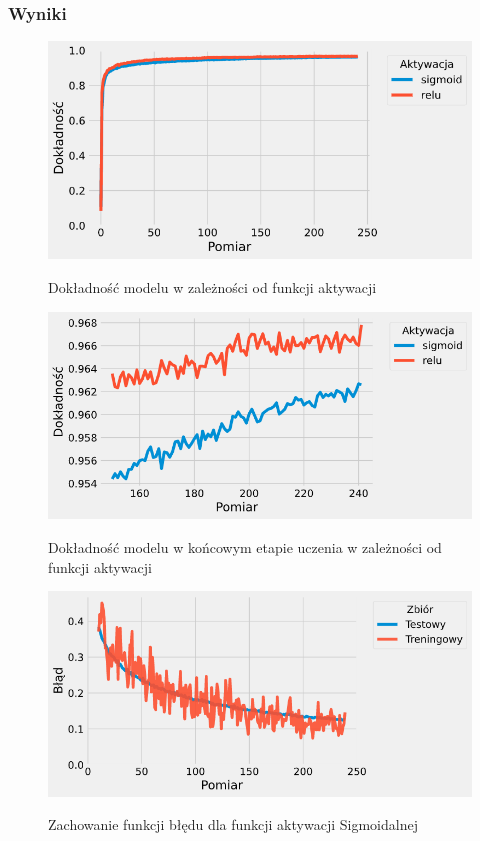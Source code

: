 \documentclass{article}
\begin{document}
\subsubsection*{Wyniki}
\begin{figure}[H]
	\centering
	\caption{Dokładność modelu w zależności od funkcji aktywacji}
	\includegraphics[width=\textwidth]{activation_acc.png}
	\label{fig:res51}
\end{figure}
\begin{figure}[H]
	\centering
	\caption{Dokładność modelu w końcowym etapie uczenia w zależności od funkcji aktywacji}
	\includegraphics[width=\textwidth]{activation_acc_zoom.png}
	\label{fig:res52}
\end{figure}
\begin{figure}[H]
	\centering
	\caption{Zachowanie funkcji błędu dla funkcji aktywacji Sigmoidalnej}
	\includegraphics[width=\textwidth]{activation_err_sig.png}
	\label{fig:res53}
\end{figure}
\end{document}
